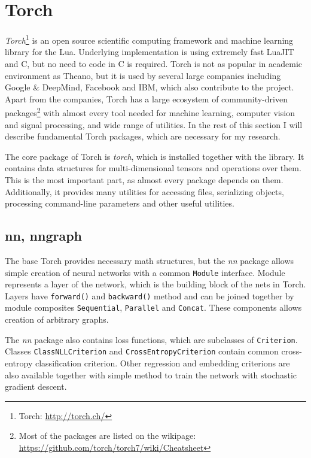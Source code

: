 \section{Torch}

\emph{Torch}\footnote{Torch: \url{http://torch.ch/}} is an open source scientific computing framework and machine learning library for the Lua. Underlying implementation is using extremely fast LuaJIT and C, but no need to code in C is required. Torch is not as popular in academic environment as Theano, but it is used by several large companies including Google \& DeepMind, Facebook and IBM, which also contribute to the project. Apart from the companies, Torch has a large ecosystem of community-driven packages\footnote{Most of the packages are listed on the wikipage: \url{https://github.com/torch/torch7/wiki/Cheatsheet}} with almost every tool needed for machine learning, computer vision and signal processing, and wide range of utilities. In the rest of this section I will describe fundamental Torch packages, which are necessary for my research.

The core package of Torch is \emph{torch}, which is installed together with the library. It contains data structures for multi-dimensional tensors and operations over them. This is the most important part, as almost every package depends on them. Additionally, it provides many utilities for accessing files, serializing objects, processing command-line parameters and other useful utilities.

\subsection{nn, nngraph}

The base Torch provides necessary math structures, but the \emph{nn} package allows simple creation of neural networks with a common \texttt{Module} interface. Module represents a layer of the network, which is the building block of the nets in Torch. Layers have \texttt{forward()} and \texttt{backward()} method and can be joined together by module composites \texttt{Sequential}, \texttt{Parallel} and \texttt{Concat}. These components allows creation of arbitrary graphs.

The \emph{nn} package also contains loss functions, which are subclasses of \texttt{Criterion}. Classes \texttt{ClassNLLCriterion} and \texttt{CrossEntropyCriterion} contain common cross-entropy classification criterion. Other regression and embedding criterions are also available together with simple method to train the network with stochastic gradient descent.

